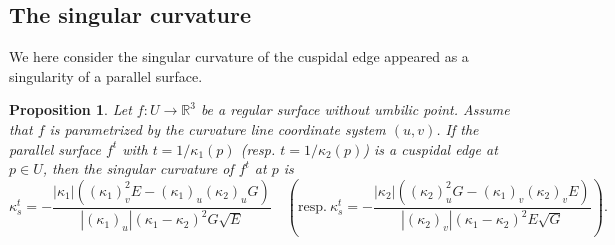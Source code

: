 \documentclass[11pt,a4paper,pdflatex,final]{amsart}
\theoremstyle{plain}
\newtheorem{proposition}[theorem]{Proposition}%
\theoremstyle{definition}
\theoremstyle{remark}
\newcommand{\0}{\bm{0}}
\newcommand{\R}{\mathbb{R}}
\numberwithin{equation}{section}
\begin{document}
\subsection{The singular curvature}
We here consider the singular curvature of the cuspidal edge 
appeared as a singularity of a parallel surface. 
\begin{proposition}\label{prop:ks-para}
	Let $f\colon U\to\R^3$ be a regular surface without umbilic point. 
	Assume that $f$ is parametrized by the curvature line coordinate system $(u,v)$. 
	If the parallel surface $f^t$ with $t=1/\kappa_1(p)$ \textup{(}resp. $t=1/\kappa_2(p)$\textup{)} 
	is a cuspidal edge at $p\in U$, then the singular curvature of $f^t$ at $p$ is  
	\[
	\kappa_s^t=-\frac{|\kappa_1|((\kappa_1)_v^2E-(\kappa_1)_u(\kappa_2)_uG)}
	{|(\kappa_1)_u|(\kappa_1-\kappa_2)^2G\sqrt{E}}\quad 
	\left(\text{resp.}~\kappa_s^t=-\frac{|\kappa_2|((\kappa_2)_u^2G-(\kappa_1)_v(\kappa_2)_vE)}
	{|(\kappa_2)_v|(\kappa_1-\kappa_2)^2E\sqrt{G}}\right).
	\]
\end{proposition}
\end{document}
